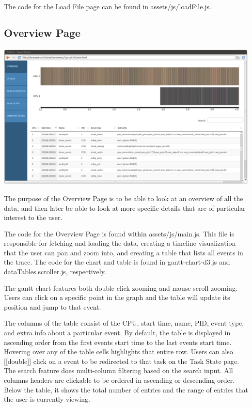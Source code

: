 \documentclass{hmcclinic}
\begin{document}
The code for the Load File page can be found in assets/js/loadFile.js.
  \subsection{Overview Page} 
  
  \includegraphics[scale=0.25]{overview-page.png}
  
The purpose of the Overview Page is to be able to look at an overview of all the data, and then later be able to look at more specific details that are of particular interest to the user.

    The code for the Overview Page is found within assets/js/main.js. This file is
    responsible for fetching and loading the data, creating a timeline
    visualization that the user can pan and zoom into, and creating a table that
    lists all events in the trace. The code for the chart and table is found in
    gantt-chart-d3.js and dataTables.scroller.js, respectively.

    The gantt chart features both double click zooming and mouse scroll zooming. Users can click on a specific point in the graph and the table will update its position and jump to that event. 

    The columns of the table consist of the CPU, start time, name, PID, event type, and extra info about a particular event. By default, the table is displayed in ascending order from the first events start time to the last events start time. Hovering over any of the table cells highlights that entire row. Users can also [[double]] click on a event to be redirected to that task on the Task State page. The search feature does multi-column filtering based on the search input. All columns headers are clickable to be ordered in ascending or descending order. Below the table, it shows the total number of entries and the range of entries that the user is currently viewing.
\end{document}

